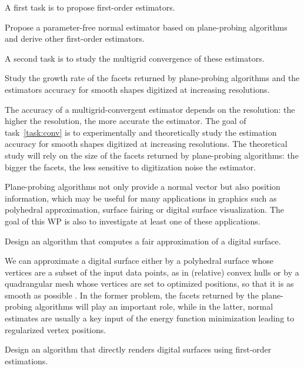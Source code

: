 A first task is to propose first-order estimators. 

\begin{Task}
  \label{task:normal}
  Propose a parameter-free normal estimator based on plane-probing algorithms and
  derive other first-order estimators.  
\end{Task}

A second task is to study the multigrid convergence of these estimators. 

\begin{Task}
  \label{task:conv}
  Study the growth rate of the facets returned by plane-probing algorithms
  and the estimators accuracy for smooth shapes digitized at increasing resolutions. 
\end{Task}

The accuracy of a multigrid-convergent estimator depends on the resolution: the higher the resolution,
the more accurate the estimator. The goal of task~\ref{task:conv} is to experimentally and theoretically
study the estimation accuracy for smooth shapes digitized at increasing resolutions. The theoretical study
will rely on the size of the facets returned by plane-probing algorithms: the bigger the facets,
the less sensitive to digitization noise the estimator. 

Plane-probing algorithms not only provide a normal vector but also position information,
which may be useful for many applications in graphics such as polyhedral approximation,
surface fairing or digital surface visualization. The goal of this WP is also to investigate
at least one of these applications.   

\begin{Task}
  \label{task:approx}
  Design an algorithm that computes a fair approximation of a digital surface. 
\end{Task}

We can approximate a digital surface either by a polyhedral surface whose vertices 
are a subset of the input data points, as in (relative) convex hulls 
\cite{Klette2001,Schultz2009} 
or by a quadrangular mesh whose vertices are set to optimized positions, so that it is
as smooth as possible \cite{Coeurjolly2017}. In the former problem, the facets returned
by the plane-probing algorithms will play an important role, while in the latter,
normal estimates are usually a key input of the energy function minimization leading
to regularized vertex positions.  

\begin{Task}
  \label{task:rendering}
  Design an algorithm that directly renders digital surfaces using first-order estimations.  
\end{Task}


